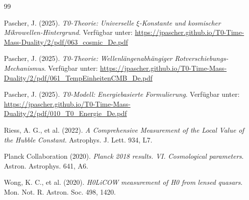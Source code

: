 	\begin{thebibliography}{99}
		
		Pascher, J. (2025). \textit{T0-Theorie: Universelle $\xi$-Konstante und kosmischer Mikrowellen-Hintergrund}. Verfügbar unter: \url{https://jpascher.github.io/T0-Time-Mass-Duality/2/pdf/063_cosmic_De.pdf}
		
		Pascher, J. (2025). \textit{T0-Theorie: Wellenlängenabhängiger Rotverschiebungs-Mechanismus}. Verfügbar unter: \url{https://jpascher.github.io/T0-Time-Mass-Duality/2/pdf/061_TempEinheitenCMB_De.pdf}
		
		Pascher, J. (2025). \textit{T0-Modell: Energiebasierte Formulierung}. Verfügbar unter: \url{https://jpascher.github.io/T0-Time-Mass-Duality/2/pdf/010_T0_Energie_De.pdf}
		
		Riess, A. G., et al. (2022). \textit{A Comprehensive Measurement of the Local Value of the Hubble Constant}. Astrophys. J. Lett. 934, L7.
		
		Planck Collaboration (2020). \textit{Planck 2018 results. VI. Cosmological parameters}. Astron. Astrophys. 641, A6.
		
		Wong, K. C., et al. (2020). \textit{H0LiCOW measurement of H0 from lensed quasars}. Mon. Not. R. Astron. Soc. 498, 1420.
		
	\end{thebibliography}
	